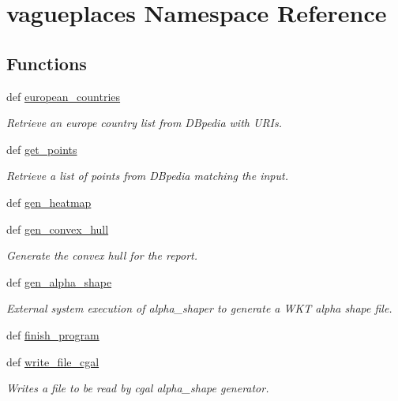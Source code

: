 \hypertarget{namespacevagueplaces}{\section{vagueplaces \-Namespace \-Reference}
\label{namespacevagueplaces}
}
\subsection*{\-Functions}
\begin{DoxyCompactItemize}
\item 
def \hyperlink{namespacevagueplaces_adec54b9e74dc2de30d17a2fe161f137c}{european\-\_\-countries}
\begin{DoxyCompactList}\small\item\em \-Retrieve an europe country list from \-D\-Bpedia with \-U\-R\-Is. \end{DoxyCompactList}\item 
def \hyperlink{namespacevagueplaces_aed235c5c580e7ab436215ad07be55b27}{get\-\_\-points}
\begin{DoxyCompactList}\small\item\em \-Retrieve a list of points from \-D\-Bpedia matching the input. \end{DoxyCompactList}\item 
def \hyperlink{namespacevagueplaces_a085e07955df048db8ed1621669a4a064}{gen\-\_\-heatmap}
\item 
def \hyperlink{namespacevagueplaces_abace2d9a58e6249fea81bb4163cd9ef6}{gen\-\_\-convex\-\_\-hull}
\begin{DoxyCompactList}\small\item\em \-Generate the convex hull for the report. \end{DoxyCompactList}\item 
def \hyperlink{namespacevagueplaces_a97ab699f1b7ffdaf4b86a2342cc1bdc3}{gen\-\_\-alpha\-\_\-shape}
\begin{DoxyCompactList}\small\item\em \-External system execution of alpha\-\_\-shaper to generate a \-W\-K\-T alpha shape file. \end{DoxyCompactList}\item 
def \hyperlink{namespacevagueplaces_a8384e83cc2817ccd5697611b911be2e5}{finish\-\_\-program}
\item 
def \hyperlink{namespacevagueplaces_a31c6bc6970f61bd314e35668a15bfa6f}{write\-\_\-file\-\_\-cgal}
\begin{DoxyCompactList}\small\item\em \-Writes a file to be read by cgal alpha\-\_\-shape generator. \end{DoxyCompactList}\item 

\end{DoxyCompactItemize}
